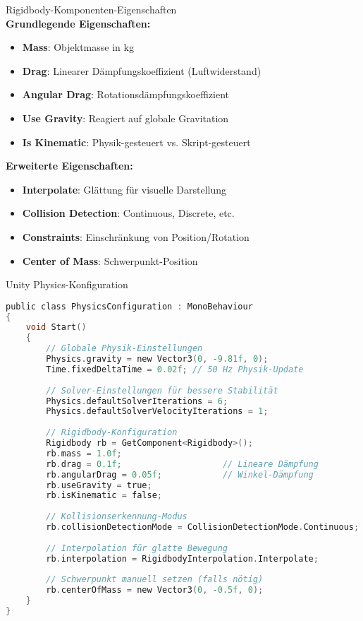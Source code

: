 \begin{definition}{Rigidbody-Komponenten-Eigenschaften}\\
    \textbf{Grundlegende Eigenschaften:}
    \begin{itemize}
        \item \textbf{Mass}: Objektmasse in kg
        \item \textbf{Drag}: Linearer Dämpfungskoeffizient (Luftwiderstand)
        \item \textbf{Angular Drag}: Rotationsdämpfungskoeffizient
        \item \textbf{Use Gravity}: Reagiert auf globale Gravitation
        \item \textbf{Is Kinematic}: Physik-gesteuert vs. Skript-gesteuert
    \end{itemize}
    
    \textbf{Erweiterte Eigenschaften:}
    \begin{itemize}
        \item \textbf{Interpolate}: Glättung für visuelle Darstellung
        \item \textbf{Collision Detection}: Continuous, Discrete, etc.
        \item \textbf{Constraints}: Einschränkung von Position/Rotation
        \item \textbf{Center of Mass}: Schwerpunkt-Position
    \end{itemize}
\end{definition}

\begin{code}{Unity Physics-Konfiguration}\\
\begin{lstlisting}[language=C, style=basesmol]
public class PhysicsConfiguration : MonoBehaviour 
{
    void Start() 
    {
        // Globale Physik-Einstellungen
        Physics.gravity = new Vector3(0, -9.81f, 0);
        Time.fixedDeltaTime = 0.02f; // 50 Hz Physik-Update
        
        // Solver-Einstellungen für bessere Stabilität
        Physics.defaultSolverIterations = 6;
        Physics.defaultSolverVelocityIterations = 1;
        
        // Rigidbody-Konfiguration
        Rigidbody rb = GetComponent<Rigidbody>();
        rb.mass = 1.0f;
        rb.drag = 0.1f;                    // Lineare Dämpfung
        rb.angularDrag = 0.05f;            // Winkel-Dämpfung
        rb.useGravity = true;
        rb.isKinematic = false;
        
        // Kollisionserkennung-Modus
        rb.collisionDetectionMode = CollisionDetectionMode.Continuous;
        
        // Interpolation für glatte Bewegung
        rb.interpolation = RigidbodyInterpolation.Interpolate;
        
        // Schwerpunkt manuell setzen (falls nötig)
        rb.centerOfMass = new Vector3(0, -0.5f, 0);
    }
}
\end{lstlisting}
\end{code}

